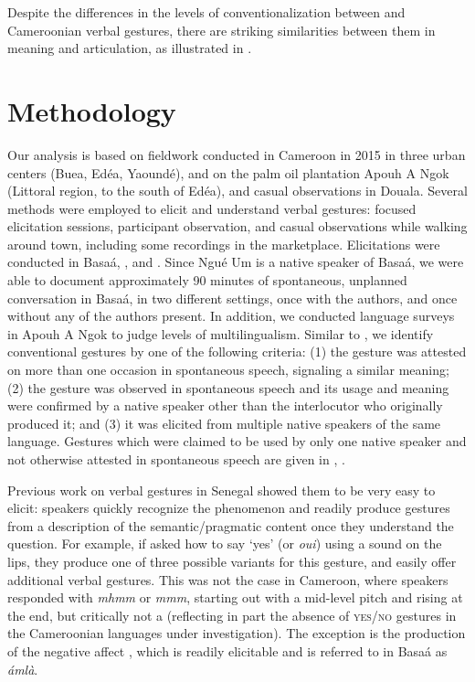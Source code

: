 \documentclass[output=paper
,newtxmath
,modfonts
,nonflat]{langsci/langscibook}
\begin{document}
Despite the differences in the levels of conventionalization between  and Cameroonian verbal gestures, there are striking similarities between them in meaning and articulation, as illustrated in . 


\section{Methodology}

Our analysis is based on fieldwork conducted in Cameroon in 2015 in three urban centers (Buea, Ed\'{e}a, Yaound\'{e}), and on the palm oil plantation Apouh A Ngok (Littoral region, to the south of Ed\'{e}a), and casual observations in Douala.  Several methods were employed to elicit and understand verbal gestures: focused elicitation sessions, participant observation, and casual observations while walking around town, including some recordings in the marketplace. Elicitations were conducted in Basa\'{a}, , and . Since Ngu\'{e} Um is a native speaker of Basa\'{a}, we were able to document approximately 90 minutes of spontaneous, unplanned conversation in Basa\'{a}, in two different settings, once with the authors, and once without any of the authors present. In addition, we conducted language surveys in Apouh A Ngok to judge levels of multilingualism. Similar to \citet[191]{brookes2004}, we identify conventional gestures by one of the following criteria: (1) the gesture was attested on more than one occasion in spontaneous speech, signaling a similar meaning; (2) the gesture was observed in spontaneous speech and its usage and meaning were confirmed by a native speaker other than the interlocutor who originally produced it; and (3) it was elicited from multiple native speakers of the same language. Gestures which were claimed to be used by only one native speaker and not otherwise attested in spontaneous speech are given in , .

Previous work on  verbal gestures in Senegal showed them to be very easy to elicit:  speakers quickly recognize the phenomenon and readily produce gestures from a description of the semantic/pragmatic content once they understand the question. For example, if asked how to say `yes' (or \textit{oui}) using a sound on the lips, they produce one of three possible  variants for this gesture, and easily offer additional verbal gestures. This was not the case in Cameroon, where speakers responded with \textit{mhmm} or \textit{mmm}, starting out with a mid-level pitch and rising at the end, but critically not a  (reflecting in part the absence of \textsc {yes/no} gestures in the Cameroonian languages under investigation).  The exception is the production of the negative affect , which is readily elicitable and is referred to in Basa\'{a} as \textit{\tS\'{a}ml\`{a}}.
\end{document}
